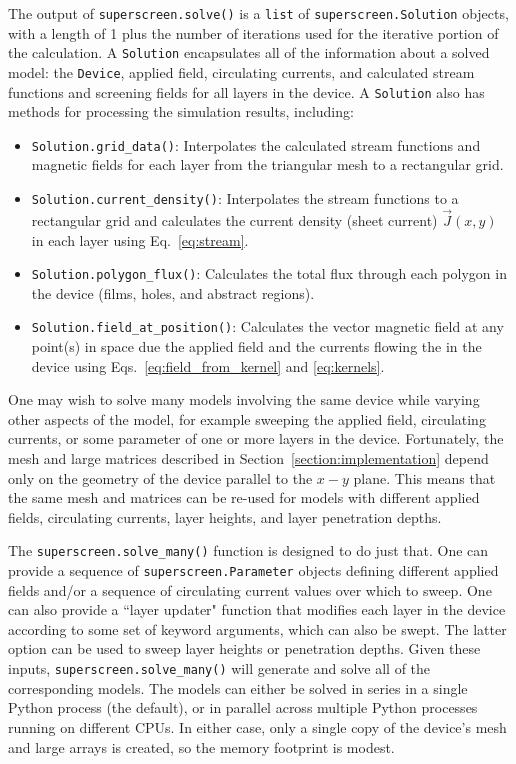 \documentclass{article}
\begin{document}
The output of \texttt{superscreen.solve()} is a \texttt{list} of \texttt{superscreen.Solution} objects, with a length of 1 plus the number of iterations used for the iterative portion of the calculation. A \texttt{Solution} encapsulates all of the information about a solved model: the \texttt{Device}, applied field, circulating currents, and calculated stream functions and screening fields for all layers in the device. A \texttt{Solution} also has methods for processing the simulation results, including:
\begin{itemize}
    \item{
    \texttt{Solution.grid_data()}: Interpolates the calculated stream functions and magnetic fields for each layer from the triangular mesh to a rectangular grid.
    }
    \item{
    \texttt{Solution.current_density()}: Interpolates the stream functions to a rectangular grid and calculates the current density (sheet current) $\vec{J}(x, y)$ in each layer using Eq.~\ref{eq:stream}.
    }
    \item{
    \texttt{Solution.polygon_flux()}: Calculates the total flux through each polygon in the device (films, holes, and abstract regions).
    }
    \item{
    \texttt{Solution.field_at_position()}: Calculates the vector magnetic field at any point(s) in space due the applied field and the currents flowing the in the device using Eqs.~\ref{eq:field_from_kernel} and \ref{eq:kernels}.
    }
\end{itemize}

One may wish to solve many models involving the same device while varying other aspects of the model, for example sweeping the applied field, circulating currents, or some parameter of one or more layers in the device. Fortunately, the mesh and large matrices described in Section~\ref{section:implementation} depend only on the geometry of the device parallel to the $x-y$ plane. This means that the same mesh and matrices can be re-used for models with different applied fields, circulating currents, layer heights, and layer penetration depths.

The \texttt{superscreen.solve_many()} function is designed to do just that. One can provide a sequence of \texttt{superscreen.Parameter} objects defining different applied fields and/or a sequence of circulating current values over which to sweep. One can also provide a ``layer updater" function that modifies each layer in the device according to some set of keyword arguments, which can also be swept. The latter option can be used to sweep layer heights or penetration depths. Given these inputs, \texttt{superscreen.solve_many()} will generate and solve all of the corresponding models. The models can either be solved in series in a single Python process (the default), or in parallel across multiple Python processes running on different CPUs. In either case, only a single copy of the device's mesh and large arrays is created, so the memory footprint is modest.
\end{document}
